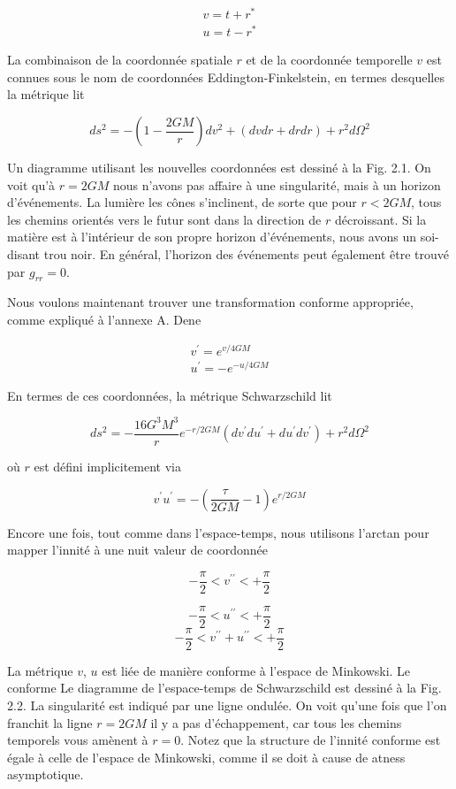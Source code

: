 $$
\begin{array}{l}
v=t+r^{*} \\
u=t-r^{*}
\end{array}
$$


La combinaison de la coordonnée spatiale $r$ et de la coordonnée temporelle $v$ est
connues sous le nom de coordonnées Eddington-Finkelstein, en termes desquelles la métrique
lit

$$
d s^{2}=-\left(1-\frac{2 G M}{r}\right) d v^{2}+(d v d r+d r d r)+r^{2} d \Omega^{2}
$$

Un diagramme utilisant les nouvelles coordonnées est dessiné à la Fig. 2.1. On voit qu'à $r =2GM$ nous n'avons pas affaire à une singularité, mais à un horizon d'événements. La lumière les cônes s'inclinent, de sorte que pour $r < 2GM$, tous les chemins orientés vers le futur sont dans la direction de $r$ décroissant. Si la matière est à l'intérieur de son propre horizon d'événements, nous avons un soi-disant trou noir. En général, l'horizon des événements peut également être trouvé par $g _{rr} = 0$.

Nous voulons maintenant trouver une transformation conforme appropriée, comme expliqué à l'annexe A. Dene

$$
\begin{array}{l}
v^{\prime}=e^{v / 4 G M} \\
u^{\prime}=-e^{-u / 4 G M}
\end{array}
$$

En termes de ces coordonnées, la métrique Schwarzschild lit

$$
d s^{2}=-\frac{16 G^{3} M^{3}}{r} e^{-r / 2 G M}\left(d v^{\prime} d u^{\prime}+d u^{\prime} d v^{\prime}\right)+r^{2} d \Omega^{2}
$$

où $r $ est défini implicitement via

$$
v^{\prime} u^{\prime}=-\left(\frac{\tau}{2 G M}-1\right) e^{r / 2 G M}
$$

Encore une fois, tout comme dans l'espace-temps, nous utilisons l'arctan pour mapper l'innité à une nuit valeur de coordonnée

$$
-\frac{\pi}{2}<v^{\prime \prime}<+\frac{\pi}{2} 
$$


$$
-\frac{\pi}{2}<u^{\prime \prime}<+\frac{\pi}{2}
$$
$$
-\frac{\pi}{2}<v^{\prime \prime}+u^{\prime \prime}<+\frac{\pi}{2}
$$


La métrique $v$, $u$ est liée de manière conforme à l'espace de Minkowski. Le conforme
Le diagramme de l'espace-temps de Schwarzschild est dessiné à la Fig. 2.2. La singularité est indiqué par une ligne ondulée. On voit qu'une fois que l'on franchit la ligne $r = 2GM$ il y a pas d'échappement, car tous les chemins temporels vous amènent à $r = 0$. Notez que la structure de l'innité conforme est égale à celle de l'espace de Minkowski, comme il se doit à cause de atness asymptotique.


